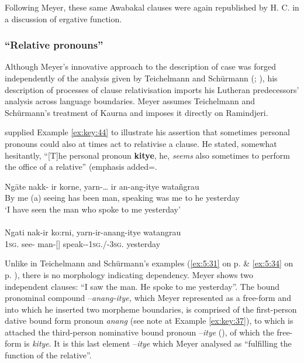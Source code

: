 \largerpage
Following Meyer, these same Awabakal clauses were again republished by H. C. \citet[489]{gabelentz_uber_1861} in a discussion of ergative function.

\subsubsection{``Relative pronouns''}
\label{sec:key:6.1.2.9}\label{bkm:Ref73381962}

Although Meyer’s innovative approach to the description of case was forged independently of the analysis given by Teichelmann and Schürmann (\citeyear{teichelmann_outlines_1840}; ), his description of processes of clause relativisation imports his Lutheran predecessors' analysis across language boundaries. Meyer assumes Teichelmann and Schürmann’s treatment of Kaurna and imposes it directly on Ramindjeri.

\citet[33]{meyer_vocabulary_1843} supplied Example \ref{ex:key:44} to illustrate his assertion that sometimes personal pronouns could also at times act to relativise a clause. He stated, somewhat hesitantly, “[T]he personal pronoun \textbf{kitye}, he, \textit{seems} also sometimes to perform the office of a relative” (emphasis added=.

\ea\label{ex:key:44} %
	\gll Ngāte {} nakk- ir korne, yarn-… ir an-ang-itye watañgrau \\
	{By me} (a) seeing {has been} man, speaking was {me to he} yesterday \\
	\glt `I have seen the man who spoke to me yesterday' \\
	\citep[33]{meyer_vocabulary_1843} \\
	\gll Ngati nak-ir ko:rni, yarn-ir-anang-itye watangrau \\
	1\textsc{sg}. see- man-[]   speak--1\textsc{sg}./-3\textsc{sg}.       yesterday \\
\z

Unlike in Teichelmann and Schürmann’s examples (\ref{ex:5:31} on p. \pageref{ex:5:31} \& \ref{ex:5:34} on p. \pageref{ex:5:34}), there is no morphology indicating dependency. Meyer shows two independent clauses: “I saw the man. He spoke to me yesterday”. The bound pronominal compound –\textit{anang-itye,} which Meyer represented as a free-form and into which he inserted two morpheme boundaries, is comprised of the first-person dative bound form pronoun \textit{anang} (see note at Example \ref{ex:key:37}), to which is attached the third-person nominative bound pronoun –\textit{itye} (), of which the free-form is \textit{kitye}. It is this last element –\textit{itye} which Meyer analysed as “fulfilling the function of the relative”.

